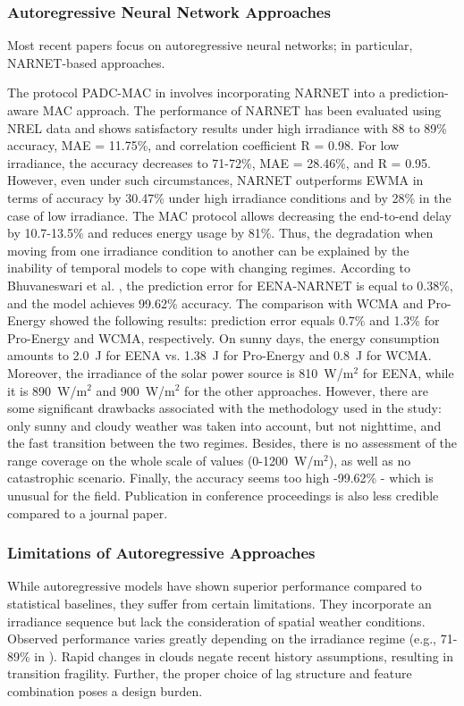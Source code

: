 \documentclass[journal]{IEEEtran}
\begin{document}
\subsubsection{Autoregressive Neural Network Approaches}
Most recent papers focus on autoregressive neural networks; in particular, NARNET-based approaches.

The protocol PADC-MAC in \cite{ref11} involves incorporating NARNET into a prediction-aware MAC approach. The performance of NARNET has been evaluated using NREL data and shows satisfactory results under high irradiance with 88 to 89\%  accuracy, MAE = 11.75\%, and correlation coefficient R = 0.98. For low irradiance, the accuracy decreases to 71-72\%, MAE = 28.46\%, and R = 0.95. However, even under such circumstances, NARNET outperforms EWMA in terms of accuracy by 30.47\% under high irradiance conditions and by 28\% in the case of low irradiance. The MAC protocol allows decreasing the end-to-end delay by 10.7-13.5\% and reduces energy usage by 81\%. Thus, the degradation when moving from one irradiance condition to another can be explained by the inability of temporal models to cope with changing regimes.
According to Bhuvaneswari et al. \cite{ref12}, the prediction error for EENA-NARNET is equal to 0.38\%, and the model achieves 99.62\% accuracy. The comparison with WCMA and Pro-Energy showed the following results: prediction error equals 0.7\% and 1.3\% for Pro-Energy and WCMA, respectively. On sunny days, the energy consumption amounts to 2.0~J for EENA vs. 1.38~J for Pro-Energy and 0.8~J for WCMA. Moreover, the irradiance of the solar power source is 810~W/m$^2$ for EENA, while it is 890~W/m$^2$ and 900~W/m$^2$ for the other approaches. However, there are some significant drawbacks associated with the methodology used in the study: only sunny and cloudy weather was taken into account, but not nighttime, and the fast transition between the two regimes. Besides, there is no assessment of the range coverage on the whole scale of values (0-1200~W/m$^2$), as well as no catastrophic scenario. Finally, the accuracy seems too high -99.62\% - which is unusual for the field. Publication in conference proceedings is also less credible compared to a journal paper.
\subsubsection{Limitations of Autoregressive Approaches}
While autoregressive models have shown superior performance compared to statistical baselines, they suffer from certain limitations. They incorporate an irradiance sequence but lack the consideration of spatial weather conditions. Observed performance varies greatly depending on the irradiance regime (e.g., 71-89\% in \cite{ref11}). Rapid changes in clouds negate recent history assumptions, resulting in transition fragility. Further, the proper choice of lag structure and feature combination poses a design burden.
\end{document}
